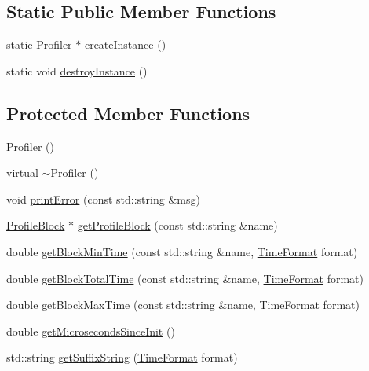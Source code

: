 \subsection*{Static Public Member Functions}
\begin{CompactItemize}
\item 
static \hyperlink{class_j_g_t_l_1_1_profiler}{Profiler} $\ast$ \hyperlink{class_j_g_t_l_1_1_profiler_a88c187ec0ec5d886eb0fb6bee98b7e5}{create\-Instance} ()
\item 
static void \hyperlink{class_j_g_t_l_1_1_profiler_cb990d68355312b6cd7a1f494e4dd33c}{destroy\-Instance} ()
\end{CompactItemize}
\subsection*{Protected Member Functions}
\begin{CompactItemize}
\item 
\hyperlink{class_j_g_t_l_1_1_profiler_8e373e2c712a2828e5384e9079958f9f}{Profiler} ()
\item 
virtual \hyperlink{class_j_g_t_l_1_1_profiler_d3678f506e4d2342604423fa035930be}{$\sim$Profiler} ()
\item 
void \hyperlink{class_j_g_t_l_1_1_profiler_d246ea0daca1f81252ff2bd316ea6d08}{print\-Error} (const std::string \&msg)
\item 
\hyperlink{struct_j_g_t_l_1_1_profile_block}{Profile\-Block} $\ast$ \hyperlink{class_j_g_t_l_1_1_profiler_cfa347cb9cc960c9c4fdf0d886785153}{get\-Profile\-Block} (const std::string \&name)
\item 
double \hyperlink{class_j_g_t_l_1_1_profiler_ee7211e4dc27568848d92ed6a66d91f9}{get\-Block\-Min\-Time} (const std::string \&name, \hyperlink{namespace_j_g_t_l_11a34d88ecadd1c99354adc21fd5abe6}{Time\-Format} format)
\item 
double \hyperlink{class_j_g_t_l_1_1_profiler_9ebb538c444e9e2069d46dd100a156d4}{get\-Block\-Total\-Time} (const std::string \&name, \hyperlink{namespace_j_g_t_l_11a34d88ecadd1c99354adc21fd5abe6}{Time\-Format} format)
\item 
double \hyperlink{class_j_g_t_l_1_1_profiler_b52d3f1a17f0e589cb898dd28b4b6f08}{get\-Block\-Max\-Time} (const std::string \&name, \hyperlink{namespace_j_g_t_l_11a34d88ecadd1c99354adc21fd5abe6}{Time\-Format} format)
\item 
double \hyperlink{class_j_g_t_l_1_1_profiler_dbdbbaa2a9a1590cbcd1f2b5204d27f1}{get\-Microseconds\-Since\-Init} ()
\item 
std::string \hyperlink{class_j_g_t_l_1_1_profiler_5aeaccffe46b7a899b57e0e54f9ce797}{get\-Suffix\-String} (\hyperlink{namespace_j_g_t_l_11a34d88ecadd1c99354adc21fd5abe6}{Time\-Format} format)
\end{CompactItemize}
